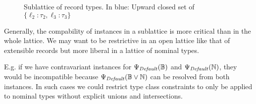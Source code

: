 \begin{figure}[ht]
  \centering
  \caption{Sublattice of record types. In {\color{blue}blue}: Upward closed set of $\{ \ell_2 : \tau_2, \ell_3 : \tau_3 \}$}
  \label{fig:upsets}
\end{figure}

Generally, the compability of instances in a sublattice is more critical than in the whole lattice.
We may want to be restrictive in an open lattice like that of extensible records but more liberal in a lattice of nominal types.

E.g. if we have contravariant instances for $\Psi_\mathit{Default}(\mathbb{B})$ and $\Psi_\mathit{Default}(\mathbb{N})$, they would be incompatible because $\Psi_\mathit{Default}(\mathbb{B} \vee \mathbb{N})$ can be resolved from both instances.
In such cases we could restrict type class constraints to only be applied to nominal types without explicit unions and intersections.
